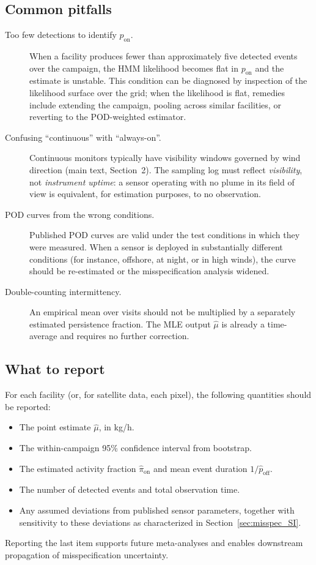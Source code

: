 \documentclass[11pt]{article}
\newcommand{\new}[1]{{\color{blue}#1}}
\begin{document}
\subsection{Common pitfalls}
\new{\begin{description}
    \item[Too few detections to identify $p_{\text{on}}$.] When a facility produces fewer than approximately five detected events over the campaign, the HMM likelihood becomes flat in $p_{\text{on}}$ and the estimate is unstable. This condition can be diagnosed by inspection of the likelihood surface over the grid; when the likelihood is flat, remedies include extending the campaign, pooling across similar facilities, or reverting to the POD-weighted estimator.
    \item[Confusing ``continuous'' with ``always-on''.] Continuous monitors typically have visibility windows governed by wind direction (main text, Section~2). The sampling log must reflect \emph{visibility}, not \emph{instrument uptime}: a sensor operating with no plume in its field of view is equivalent, for estimation purposes, to no observation.
    \item[POD curves from the wrong conditions.] Published POD curves are valid under the test conditions in which they were measured. When a sensor is deployed in substantially different conditions (for instance, offshore, at night, or in high winds), the curve should be re-estimated or the misspecification analysis widened.
    \item[Double-counting intermittency.] An empirical mean over visits should not be multiplied by a separately estimated persistence fraction. The MLE output $\hat\mu$ is already a time-average and requires no further correction.
\end{description}}

\subsection{What to report}
\new{For each facility (or, for satellite data, each pixel), the following quantities should be reported:
\begin{itemize}
    \item The point estimate $\hat\mu$, in kg/h.
    \item The within-campaign 95\% confidence interval from bootstrap.
    \item The estimated activity fraction $\hat\pi_{\text{on}}$ and mean event duration $1/\hat p_{\text{off}}$.
    \item The number of detected events and total observation time.
    \item Any assumed deviations from published sensor parameters, together with sensitivity to these deviations as characterized in Section~\ref{sec:misspec_SI}.
\end{itemize}
Reporting the last item supports future meta-analyses and enables downstream propagation of misspecification uncertainty.}




\end{document}
